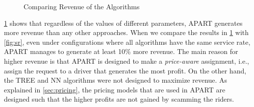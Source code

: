 \begin{figure}[h]
    \centering
    \vspace{-0.15in}
    \caption{Comparing Revenue of the Algorithms}
    \label{fig:rev}
\end{figure}

\cref{fig:rev} shows that regardless of the values of different parameters, APART generates more revenue than any other approaches. When we compare the results in \cref{fig:rev} with \cref{fig:sr}, even under configurations where all algorithms have the same service rate, APART manages to generate at least 10\% more revenue. The main reason for higher revenue is that APART is designed to make a \textit{price-aware} assignment, i.e., assign the request to a driver that generates the most profit. On the other hand, the TREE and NN algorithms were not designed to maximize revenue. As explained in \cref{sec:pricing}, the pricing models that are used in APART are designed such that the higher profits are not gained by scamming the riders.

